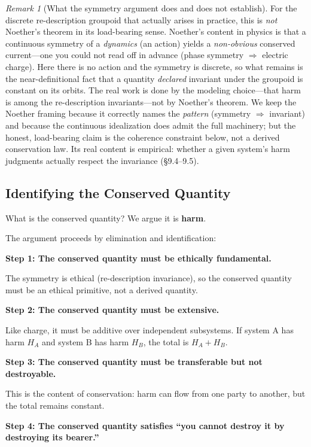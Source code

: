 \documentclass[12pt,letterpaper]{article}
\theoremstyle{definition}
\theoremstyle{remark}
\newtheorem{remark}[theorem]{Remark}
\begin{document}
\begin{remark}[What the symmetry argument does and does not establish]
For the discrete re-description groupoid that actually arises in practice, this is \emph{not} Noether's theorem in its load-bearing sense. Noether's content in physics is that a continuous symmetry of a \emph{dynamics} (an action) yields a \emph{non-obvious} conserved current---one you could not read off in advance (phase symmetry $\Rightarrow$ electric charge). Here there is no action and the symmetry is discrete, so what remains is the near-definitional fact that a quantity \emph{declared} invariant under the groupoid is constant on its orbits. The real work is done by the modeling choice---that harm is among the re-description invariants---not by Noether's theorem. We keep the Noether framing because it correctly names the \emph{pattern} (symmetry $\Rightarrow$ invariant) and because the continuous idealization does admit the full machinery; but the honest, load-bearing claim is the coherence constraint below, not a derived conservation law. Its real content is empirical: whether a given system's harm judgments actually respect the invariance (\S9.4--9.5).
\end{remark}

\subsection{Identifying the Conserved Quantity}

What is the conserved quantity? We argue it is \textbf{harm}.

The argument proceeds by elimination and identification:

\textbf{Step 1: The conserved quantity must be ethically fundamental.}

The symmetry is ethical (re-description invariance), so the conserved quantity must be an ethical primitive, not a derived quantity.

\textbf{Step 2: The conserved quantity must be extensive.}

Like charge, it must be additive over independent subsystems. If system A has harm $H_A$ and system B has harm $H_B$, the total is $H_A + H_B$.

\textbf{Step 3: The conserved quantity must be transferable but not destroyable.}

This is the content of conservation: harm can flow from one party to another, but the total remains constant.

\textbf{Step 4: The conserved quantity satisfies ``you cannot destroy it by destroying its bearer.''}
\end{document}
